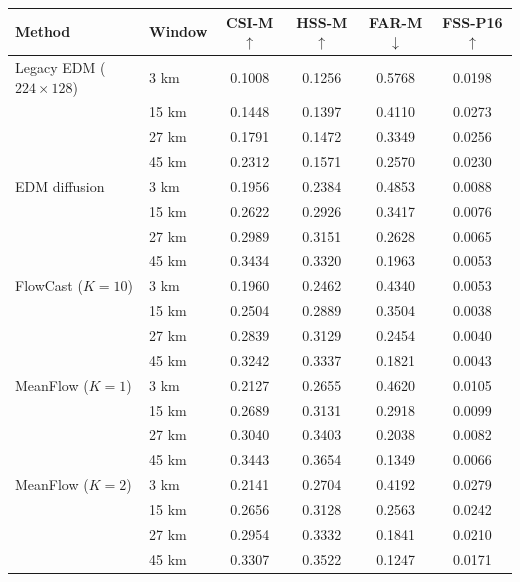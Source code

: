 \documentclass[border=10pt]{standalone}
\begin{document}
\begin{tabular}{llcccc}
\toprule
Method & Window & CSI-M $\uparrow$ & HSS-M $\uparrow$ & FAR-M $\downarrow$ & FSS-P16 $\uparrow$ \\
\midrule
Legacy EDM ($224{\times}128$) & 3 km & 0.1008 & 0.1256 & 0.5768 & 0.0198 \\
 & 15 km & 0.1448 & 0.1397 & 0.4110 & 0.0273 \\
 & 27 km & 0.1791 & 0.1472 & 0.3349 & 0.0256 \\
 & 45 km & 0.2312 & 0.1571 & 0.2570 & 0.0230 \\
EDM diffusion & 3 km & 0.1956 & 0.2384 & 0.4853 & 0.0088 \\
 & 15 km & 0.2622 & 0.2926 & 0.3417 & 0.0076 \\
 & 27 km & 0.2989 & 0.3151 & 0.2628 & 0.0065 \\
 & 45 km & 0.3434 & 0.3320 & 0.1963 & 0.0053 \\
FlowCast ($K{=}10$) & 3 km & 0.1960 & 0.2462 & 0.4340 & 0.0053 \\
 & 15 km & 0.2504 & 0.2889 & 0.3504 & 0.0038 \\
 & 27 km & 0.2839 & 0.3129 & 0.2454 & 0.0040 \\
 & 45 km & 0.3242 & 0.3337 & 0.1821 & 0.0043 \\
MeanFlow ($K{=}1$) & 3 km & 0.2127 & 0.2655 & 0.4620 & 0.0105 \\
 & 15 km & 0.2689 & 0.3131 & 0.2918 & 0.0099 \\
 & 27 km & 0.3040 & 0.3403 & 0.2038 & 0.0082 \\
 & 45 km & 0.3443 & 0.3654 & 0.1349 & 0.0066 \\
MeanFlow ($K{=}2$) & 3 km & 0.2141 & 0.2704 & 0.4192 & 0.0279 \\
 & 15 km & 0.2656 & 0.3128 & 0.2563 & 0.0242 \\
 & 27 km & 0.2954 & 0.3332 & 0.1841 & 0.0210 \\
 & 45 km & 0.3307 & 0.3522 & 0.1247 & 0.0171 \\
\bottomrule
\end{tabular}
\end{document}
